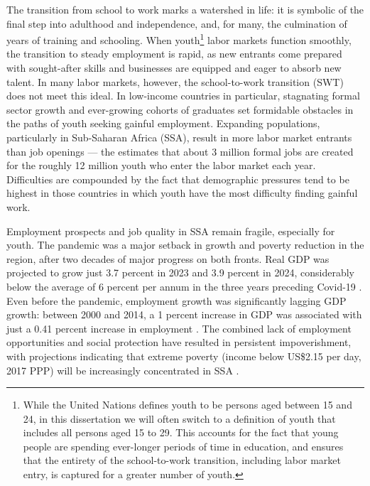 \documentclass[
  a4paper, twoside, 12pt]{book}
\begin{document}
The transition from school to work marks a watershed in life: it is symbolic of the final step into adulthood and independence, and, for many, the culmination of years of training and schooling. When youth\footnote{While the United Nations defines youth to be persons aged between 15 and 24, in this dissertation we will often switch to a definition of youth that includes all persons aged 15 to 29. This accounts for the fact that young people are spending ever-longer periods of time in education, and ensures that the entirety of the school-to-work transition, including labor market entry, is captured for a greater number of youth.} labor markets function smoothly, the transition to steady employment is rapid, as new entrants come prepared with sought-after skills and businesses are equipped and eager to absorb new talent. In many labor markets, however, the school-to-work transition (SWT) does not meet this ideal. In low-income countries in particular, stagnating formal sector growth and ever-growing cohorts of graduates set formidable obstacles in the paths of youth seeking gainful employment. Expanding populations, particularly in Sub-Saharan Africa (SSA), result in more labor market entrants than job openings --- the \textcite{africandevelopmentbank2022} estimates that about 3 million formal jobs are created for the roughly 12 million youth who enter the labor market each year. Difficulties are compounded by the fact that demographic pressures tend to be highest in those countries in which youth have the most difficulty finding gainful work.

Employment prospects and job quality in SSA remain fragile, especially for youth. The pandemic was a major setback in growth and poverty reduction in the region, after two decades of major progress on both fronts. Real GDP was projected to grow just 3.7 percent in 2023 and 3.9 percent in 2024, considerably below the average of 6 percent per annum in the three years preceding Covid-19 \autocite{africandevelopmentbank2023}. Even before the pandemic, employment growth was significantly lagging GDP growth: between 2000 and 2014, a 1 percent increase in GDP was associated with just a 0.41 percent increase in employment \autocite{africandevelopmentbank2019}. The combined lack of employment opportunities and social protection have resulted in persistent impoverishment, with projections indicating that extreme poverty (income below US\$2.15 per day, 2017 PPP) will be increasingly concentrated in SSA \autocite{worldbank2022}.
\end{document}
